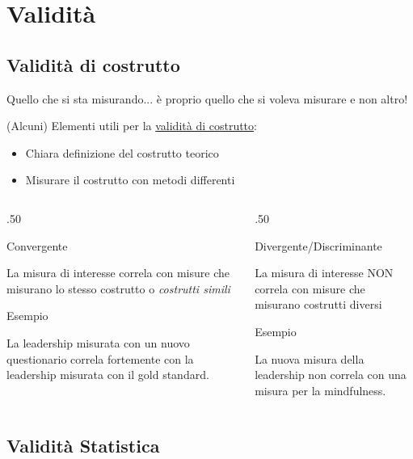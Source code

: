 \documentclass[compress]{beamer}
\begin{document}
\section{Validità}

\subsection{Validità di costrutto}

\begin{frame}
		Quello che si sta misurando... è proprio quello che si voleva misurare e non altro!
	
	(Alcuni) Elementi utili per la \underline{validità di costrutto}:
	\begin{itemize}
		\item Chiara definizione del costrutto teorico
		\item Misurare il costrutto con metodi differenti
	\end{itemize} 
	
	
	\begin{columns}[T]
		\begin{column}{.50\linewidth}
			\begin{center}
				Convergente
			\end{center}
			La misura di interesse correla con misure che misurano lo stesso costrutto o \emph{costrutti simili}
			
			\begin{block}{Esempio}
				
				La leadership misurata con un nuovo questionario correla fortemente con la leadership misurata con il gold standard.
			\end{block}
		\end{column}
		\begin{column}{.50\linewidth}
				\begin{center}
				Divergente/Discriminante
			\end{center}
			La misura di interesse NON correla con misure che misurano costrutti diversi
			
					\begin{block}{Esempio}
				
				La nuova misura della leadership non correla con una misura per la mindfulness. 
			\end{block}
		\end{column}
	\end{columns}
\end{frame}


\subsection{Validità Statistica}
\end{document}
